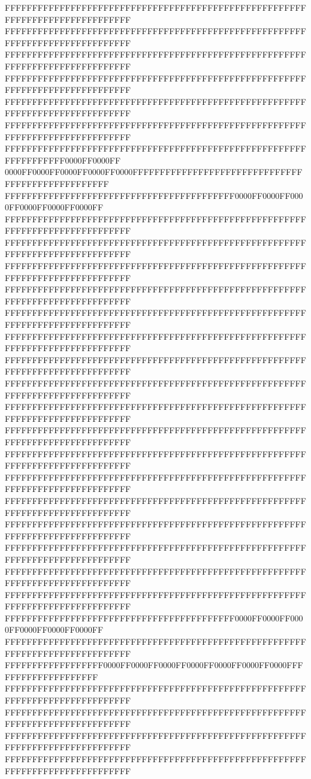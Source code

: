 FFFFFFFFFFFFFFFFFFFFFFFFFFFFFFFFFFFFFFFFFFFFFFFFFFFFFFFFFFFFFFFFFFFFFFFFFFFFFF
FFFFFFFFFFFFFFFFFFFFFFFFFFFFFFFFFFFFFFFFFFFFFFFFFFFFFFFFFFFFFFFFFFFFFFFFFFFFFF
FFFFFFFFFFFFFFFFFFFFFFFFFFFFFFFFFFFFFFFFFFFFFFFFFFFFFFFFFFFFFFFFFFFFFFFFFFFFFF
FFFFFFFFFFFFFFFFFFFFFFFFFFFFFFFFFFFFFFFFFFFFFFFFFFFFFFFFFFFFFFFFFFFFFFFFFFFFFF
FFFFFFFFFFFFFFFFFFFFFFFFFFFFFFFFFFFFFFFFFFFFFFFFFFFFFFFFFFFFFFFFFFFFFFFFFFFFFF
FFFFFFFFFFFFFFFFFFFFFFFFFFFFFFFFFFFFFFFFFFFFFFFFFFFFFFFFFFFFFFFFFFFFFFFFFFFFFF
FFFFFFFFFFFFFFFFFFFFFFFFFFFFFFFFFFFFFFFFFFFFFFFFFFFFFFFFFFFFFFFFFF0000FF0000FF
0000FF0000FF0000FF0000FF0000FFFFFFFFFFFFFFFFFFFFFFFFFFFFFFFFFFFFFFFFFFFFFFFFFF
FFFFFFFFFFFFFFFFFFFFFFFFFFFFFFFFFFFFFFFFFF0000FF0000FF0000FF0000FF0000FF0000FF
FFFFFFFFFFFFFFFFFFFFFFFFFFFFFFFFFFFFFFFFFFFFFFFFFFFFFFFFFFFFFFFFFFFFFFFFFFFFFF
FFFFFFFFFFFFFFFFFFFFFFFFFFFFFFFFFFFFFFFFFFFFFFFFFFFFFFFFFFFFFFFFFFFFFFFFFFFFFF
FFFFFFFFFFFFFFFFFFFFFFFFFFFFFFFFFFFFFFFFFFFFFFFFFFFFFFFFFFFFFFFFFFFFFFFFFFFFFF
FFFFFFFFFFFFFFFFFFFFFFFFFFFFFFFFFFFFFFFFFFFFFFFFFFFFFFFFFFFFFFFFFFFFFFFFFFFFFF
FFFFFFFFFFFFFFFFFFFFFFFFFFFFFFFFFFFFFFFFFFFFFFFFFFFFFFFFFFFFFFFFFFFFFFFFFFFFFF
FFFFFFFFFFFFFFFFFFFFFFFFFFFFFFFFFFFFFFFFFFFFFFFFFFFFFFFFFFFFFFFFFFFFFFFFFFFFFF
FFFFFFFFFFFFFFFFFFFFFFFFFFFFFFFFFFFFFFFFFFFFFFFFFFFFFFFFFFFFFFFFFFFFFFFFFFFFFF
FFFFFFFFFFFFFFFFFFFFFFFFFFFFFFFFFFFFFFFFFFFFFFFFFFFFFFFFFFFFFFFFFFFFFFFFFFFFFF
FFFFFFFFFFFFFFFFFFFFFFFFFFFFFFFFFFFFFFFFFFFFFFFFFFFFFFFFFFFFFFFFFFFFFFFFFFFFFF
FFFFFFFFFFFFFFFFFFFFFFFFFFFFFFFFFFFFFFFFFFFFFFFFFFFFFFFFFFFFFFFFFFFFFFFFFFFFFF
FFFFFFFFFFFFFFFFFFFFFFFFFFFFFFFFFFFFFFFFFFFFFFFFFFFFFFFFFFFFFFFFFFFFFFFFFFFFFF
FFFFFFFFFFFFFFFFFFFFFFFFFFFFFFFFFFFFFFFFFFFFFFFFFFFFFFFFFFFFFFFFFFFFFFFFFFFFFF
FFFFFFFFFFFFFFFFFFFFFFFFFFFFFFFFFFFFFFFFFFFFFFFFFFFFFFFFFFFFFFFFFFFFFFFFFFFFFF
FFFFFFFFFFFFFFFFFFFFFFFFFFFFFFFFFFFFFFFFFFFFFFFFFFFFFFFFFFFFFFFFFFFFFFFFFFFFFF
FFFFFFFFFFFFFFFFFFFFFFFFFFFFFFFFFFFFFFFFFFFFFFFFFFFFFFFFFFFFFFFFFFFFFFFFFFFFFF
FFFFFFFFFFFFFFFFFFFFFFFFFFFFFFFFFFFFFFFFFFFFFFFFFFFFFFFFFFFFFFFFFFFFFFFFFFFFFF
FFFFFFFFFFFFFFFFFFFFFFFFFFFFFFFFFFFFFFFFFFFFFFFFFFFFFFFFFFFFFFFFFFFFFFFFFFFFFF
FFFFFFFFFFFFFFFFFFFFFFFFFFFFFFFFFFFFFFFFFF0000FF0000FF0000FF0000FF0000FF0000FF
FFFFFFFFFFFFFFFFFFFFFFFFFFFFFFFFFFFFFFFFFFFFFFFFFFFFFFFFFFFFFFFFFFFFFFFFFFFFFF
FFFFFFFFFFFFFFFFFF0000FF0000FF0000FF0000FF0000FF0000FF0000FFFFFFFFFFFFFFFFFFFF
FFFFFFFFFFFFFFFFFFFFFFFFFFFFFFFFFFFFFFFFFFFFFFFFFFFFFFFFFFFFFFFFFFFFFFFFFFFFFF
FFFFFFFFFFFFFFFFFFFFFFFFFFFFFFFFFFFFFFFFFFFFFFFFFFFFFFFFFFFFFFFFFFFFFFFFFFFFFF
FFFFFFFFFFFFFFFFFFFFFFFFFFFFFFFFFFFFFFFFFFFFFFFFFFFFFFFFFFFFFFFFFFFFFFFFFFFFFF
FFFFFFFFFFFFFFFFFFFFFFFFFFFFFFFFFFFFFFFFFFFFFFFFFFFFFFFFFFFFFFFFFFFFFFFFFFFFFF
